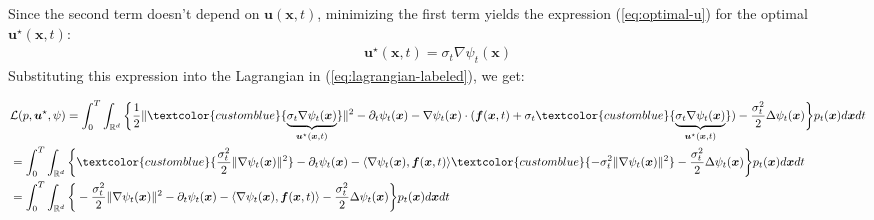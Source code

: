 \documentclass{article}
\newcommand{\bluetext}[1]{\textcolor{customblue}{#1}}
\begin{document}
Since the second term doesn't depend on $\boldsymbol{u}(\boldsymbol{x},t)$, minimizing the first term yields the expression (\ref{eq:optimal-u}) for the optimal $\boldsymbol{u}^\star(\boldsymbol{x},t)$:
\begin{align}
    \boldsymbol{u}^\star(\boldsymbol{x},t)=\sigma_t\nabla \psi_t(\boldsymbol{x})
\end{align}
Substituting this expression into the Lagrangian in (\ref{eq:lagrangian-labeled}), we get:
\begin{small}
\begin{align}
    &\mathcal{L}(p,\boldsymbol{u}^\star,\psi)=\int_0^T\int_{\mathbb{R}^d}\bigg\{\frac{1}{2}\|\bluetext{\underbrace{\sigma_t\nabla \psi_t(\boldsymbol{x})}_{\boldsymbol{u}^\star(\boldsymbol{x},t)}}\|^2-\partial_t\psi_t(\boldsymbol{x})-\nabla \psi_t (\boldsymbol{x})\cdot (\boldsymbol{f}(\boldsymbol{x},t) +\sigma_t\bluetext{\underbrace{\sigma_t\nabla \psi_t(\boldsymbol{x})}_{\boldsymbol{u}^\star(\boldsymbol{x},t)}})-\frac{\sigma_t^2}{2}\Delta\psi_t (\boldsymbol{x})\bigg\}p_t(\boldsymbol{x})d\boldsymbol{x}dt\nonumber\\
    &=\int_0^T\int_{\mathbb{R}^d}\bigg\{\bluetext{\frac{\sigma_t^2}{2}\|\nabla \psi_t(\boldsymbol{x})\|^2}-\partial_t\psi_t(\boldsymbol{x})-\langle\nabla \psi_t (\boldsymbol{x}), \boldsymbol{f}(\boldsymbol{x},t)\rangle \bluetext{-\sigma_t^2\|\nabla \psi_t(\boldsymbol{x})\|^2}-\frac{\sigma_t^2}{2}\Delta \psi_t (\boldsymbol{x})\bigg\}p_t(\boldsymbol{x})d\boldsymbol{x}dt\nonumber\\
    &=\int_0^T\int_{\mathbb{R}^d}\bigg\{-\frac{\sigma_t^2}{2}\|\nabla\psi_t(\boldsymbol{x})\|^2 -\partial_t\psi_t(\boldsymbol{x})-\langle\nabla \psi_t (\boldsymbol{x}), \boldsymbol{f}(\boldsymbol{x},t)\rangle-\frac{\sigma_t^2}{2}\Delta \psi_t (\boldsymbol{x})\bigg\}p_t(\boldsymbol{x})d\boldsymbol{x}dt
\end{align}
\end{small}
\end{document}
